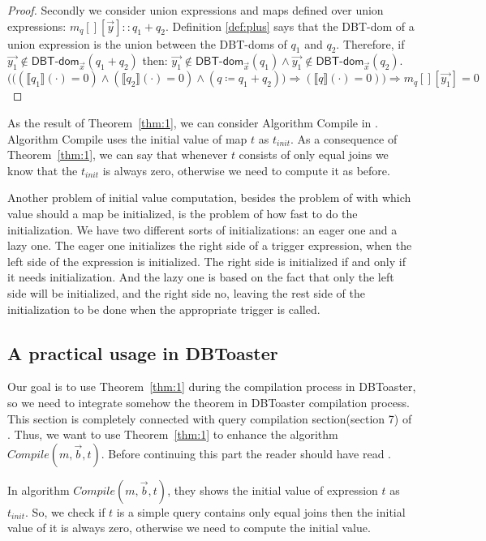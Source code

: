 \documentclass[12pt]{article}
\newcommand{\dom}{\textsf{DBT-dom}}
\begin{document}
\begin{proof}
Secondly we consider union expressions and maps defined over union expressions: $m_q[][\vec{y}]::q_1+q_2$. Definition \ref{def:plus} says that the \dom{} of a union expression is the union between the \dom{}s of $q_1$ and $q_2$. Therefore, if $\vec{y_{1}}\notin\dom{}_{\vec{x}}(q_1+q_2)$ then: $\vec{y_{1}}\notin\dom{}_{\vec{x}}(q_1)\land \vec{y_{1}}\notin\dom{}_{\vec{x}}(q_2)$.
\begin{equation}
\Big(\big((\llbracket q_{1}\rrbracket(\cdot)=0)\land (\llbracket q_{2}\rrbracket(\cdot)=0)\land(q\coloneqq q_{1}+q_{2})\big)\Rightarrow (\llbracket q\rrbracket(\cdot)=0)\Big)\Rightarrow m_{q}[][\vec{y_{1}}]=0
\end{equation}
\end{proof}
As the result of Theorem~\ref{thm:1}, we can consider Algorithm Compile in \cite{1}. Algorithm Compile uses the initial value of map $t$ as $t_{init}$. As a consequence of Theorem~\ref{thm:1}, we can say that whenever $t$ consists of only equal joins we know that the $t_{init}$ is always zero, otherwise we need to compute it as before.\\ \par
Another problem of initial value computation, besides the problem of with which value should a map be initialized, is the problem of how fast to do the initialization. We have two different sorts of initializations: an eager one and a lazy one. The eager one initializes the right side of a trigger expression, when the left side of the expression is initialized. The right side is initialized if and only if it needs initialization. And the lazy one is based on the fact that only the left side will be initialized, and the right side no, leaving the rest side of the initialization to be done when the appropriate trigger is called.
\subsection{A practical usage in DBToaster}
Our goal is to use Theorem~\ref{thm:1} during the compilation process in DBToaster, so we need to integrate somehow the theorem in DBToaster compilation process. This section is completely connected with query compilation section(section 7)  of \cite{1}.  Thus, we want to  use Theorem~\ref{thm:1} to  enhance  the algorithm $Compile(m,\vec{b},t)$.  Before continuing this part the reader should have read \cite{1}. \par
In algorithm $Compile(m,\vec{b},t)$, they shows the initial value of expression $t$ as $t_{init}$. So, we check if $t$ is a simple query contains only equal joins then the initial value of it is always zero, otherwise we need to compute the initial value. 
\end{document}
